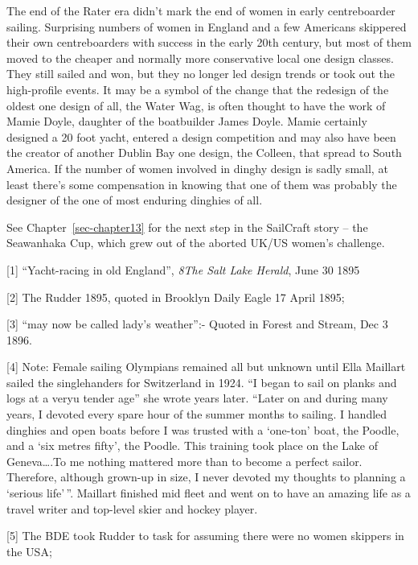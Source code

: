 \documentclass[
  letterpaper,
]{scrbook}
\begin{document}
The end of the Rater era didn't mark the end of women in early
centreboarder sailing. Surprising numbers of women in England and a few
Americans skippered their own centreboarders with success in the early
20th century, but most of them moved to the cheaper and normally more
conservative local one design classes. They still sailed and won, but
they no longer led design trends or took out the high-profile events. It
may be a symbol of the change that the redesign of the oldest one design
of all, the Water Wag, is often thought to have the work of Mamie Doyle,
daughter of the boatbuilder James Doyle. Mamie certainly designed a 20
foot yacht, entered a design competition and may also have been the
creator of another Dublin Bay one design, the Colleen, that spread to
South America. If the number of women involved in dinghy design is sadly
small, at least there's some compensation in knowing that one of them
was probably the designer of the one of most enduring dinghies of all.

See Chapter~\ref{sec-chapter13} for the next step in the SailCraft story
-- the Seawanhaka Cup, which grew out of the aborted UK/US women's
challenge.

{[}1{]} ``Yacht-racing in old England'', \emph{8The Salt Lake Herald},
June 30 1895

{[}2{]} The Rudder 1895, quoted in Brooklyn Daily Eagle 17 April 1895;

{[}3{]} ``may now be called lady's weather'':- Quoted in Forest and
Stream, Dec 3 1896.

{[}4{]} Note: Female sailing Olympians remained all but unknown until
Ella Maillart sailed the singlehanders for Switzerland in 1924. ``I
began to sail on planks and logs at a veryu tender age'' she wrote years
later. ``Later on and during many years, I devoted every spare hour of
the summer months to sailing. I handled dinghies and open boats before I
was trusted with a `one-ton' boat, the Poodle, and a `six metres fifty',
the Poodle. This training took place on the Lake of Geneva\ldots.To me
nothing mattered more than to become a perfect sailor. Therefore,
although grown-up in size, I never devoted my thoughts to planning a
`serious life'\,''. Maillart finished mid fleet and went on to have an
amazing life as a travel writer and top-level skier and hockey player.

{[}5{]} The BDE took Rudder to task for assuming there were no women
skippers in the USA;

\end{document}
